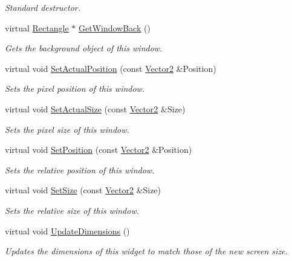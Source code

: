 \begin{DoxyCompactItemize}
\begin{DoxyCompactList}\small\item\em Standard destructor. \item\end{DoxyCompactList}\item 
virtual \hyperlink{classMezzanine_1_1UI_1_1Rectangle}{Rectangle} $\ast$ \hyperlink{classMezzanine_1_1UI_1_1Window_adff05aa4e1e6cf1c17346544377281a2}{GetWindowBack} ()
\begin{DoxyCompactList}\small\item\em Gets the background object of this window. \item\end{DoxyCompactList}\item 
virtual void \hyperlink{classMezzanine_1_1UI_1_1Window_a79929aa37e9bb297ed3ae9c09ec42dee}{SetActualPosition} (const \hyperlink{classMezzanine_1_1Vector2}{Vector2} \&Position)
\begin{DoxyCompactList}\small\item\em Sets the pixel position of this window. \item\end{DoxyCompactList}\item 
virtual void \hyperlink{classMezzanine_1_1UI_1_1Window_adda80dca776a0de7468c7937c4653eec}{SetActualSize} (const \hyperlink{classMezzanine_1_1Vector2}{Vector2} \&Size)
\begin{DoxyCompactList}\small\item\em Sets the pixel size of this window. \item\end{DoxyCompactList}\item 
virtual void \hyperlink{classMezzanine_1_1UI_1_1Window_a8e25cd61721c2321f1117720e1af41a2}{SetPosition} (const \hyperlink{classMezzanine_1_1Vector2}{Vector2} \&Position)
\begin{DoxyCompactList}\small\item\em Sets the relative position of this window. \item\end{DoxyCompactList}\item 
virtual void \hyperlink{classMezzanine_1_1UI_1_1Window_a1816409c5c9d9f7bca38510270e340e3}{SetSize} (const \hyperlink{classMezzanine_1_1Vector2}{Vector2} \&Size)
\begin{DoxyCompactList}\small\item\em Sets the relative size of this window. \item\end{DoxyCompactList}\item 
virtual void \hyperlink{classMezzanine_1_1UI_1_1Window_a793c156e8de19f44b8c132b05ed4f7b6}{UpdateDimensions} ()
\begin{DoxyCompactList}\small\item\em Updates the dimensions of this widget to match those of the new screen size. \item\end{DoxyCompactList}\end{DoxyCompactItemize}

